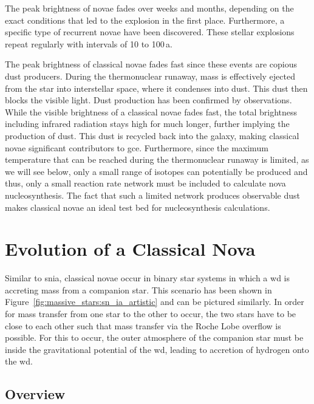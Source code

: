 The peak brightness of novae fades over weeks and months, depending on the exact conditions that led to the explosion in the first place. Furthermore, a specific type of recurrent novae have been discovered. These stellar explosions repeat regularly with intervals of 10 to 100\,a. 

The peak brightness of classical novae fades fast since these events are copious dust producers. During the thermonuclear runaway, mass is effectively ejected from the star into interstellar space, where it condenses into dust. This dust then blocks the visible light. Dust production has been confirmed by observations. While the visible brightness of a classical novae fades fast, the total brightness including infrared radiation stays high for much longer, further implying the production of dust. This dust is recycled back into the galaxy, making classical novae significant contributors to \ac{gce}. Furthermore, since the maximum temperature that can be reached during the thermonuclear runaway is limited, as we will see below, only a small range of isotopes can potentially be produced and thus, only a small reaction rate network must be included to calculate nova nucleosynthesis. The fact that such a limited network produces observable dust makes classical novae an ideal test bed for nucleosynthesis calculations.


\section{Evolution of a Classical Nova}

Similar to \acf{snia}, classical novae occur in binary star systems in which a \ac{wd} is accreting mass from a companion star. This scenario has been shown in Figure~\ref{fig:massive_stars:sn_ia_artistic} and can be pictured similarly. In order for mass transfer from one star to the other to occur, the two stars have to be close to each other such that mass transfer via the Roche Lobe overflow is possible. For this to occur, the outer atmosphere of the companion star must be inside the gravitational potential of the \ac{wd}, leading to accretion of hydrogen onto the \ac{wd}. 


\subsection{Overview}

